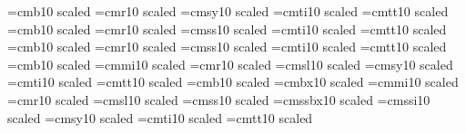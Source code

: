 %
\font\kxbgbf=cmb10     scaled 
\font\kxbgrm=cmr10     scaled 
\font\kxbgsy=cmsy10    scaled 
\font\kxbgit=cmti10    scaled 
\font\kxbgtt=cmtt10    scaled 
\font\kwbgbf=cmb10     scaled 
\font\kwbgrm=cmr10     scaled 
\font\kwbgss=cmss10    scaled 
\font\kwbgit=cmti10    scaled 
\font\kwbgtt=cmtt10    scaled 
\font\kvbgbf=cmb10     scaled 
\font\kvbgrm=cmr10     scaled 
\font\kvbgss=cmss10    scaled 
\font\kvbgit=cmti10    scaled 
\font\kvbgtt=cmtt10    scaled 
\font\kbigbf=cmb10     scaled 
\font\kbigmi=cmmi10    scaled 
\font\kbigrm=cmr10     scaled 
\font\kbigsl=cmsl10    scaled 
\font\kbigsy=cmsy10    scaled 
\font\kbigit=cmti10    scaled 
\font\kbigtt=cmtt10    scaled 
\font\ksmbf=cmb10      scaled \magstephalf
\font\ksmbx=cmbx10     scaled \magstephalf
\font\ksmmi=cmmi10     scaled \magstephalf
\font\ksmrm=cmr10      scaled \magstephalf
\font\ksmsl=cmsl10     scaled \magstephalf
\font\ksmss=cmss10     scaled \magstephalf
\font\ksmsb=cmssbx10   scaled \magstephalf
\font\ksmsi=cmssi10    scaled \magstephalf
\font\ksmsy=cmsy10     scaled \magstephalf
\font\ksmit=cmti10     scaled \magstephalf
\font\ksmtt=cmtt10     scaled \magstephalf
